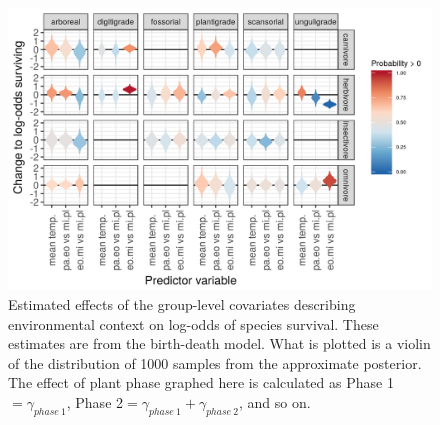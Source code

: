 \documentclass[12pt,letterpaper]{article}
\begin{document}
\begin{figure}[ht]
  \centering
  \includegraphics[width=\textwidth,height=0.4\textheight,keepaspectratio=true]{figure/group_on_survival_bd}
  \caption[Effects of group-level covariates on log-odds of ecotype survival as estimated from the birth-death model]{Estimated effects of the group-level covariates describing environmental context on log-odds of species survival. These estimates are from the birth-death model. What is plotted is a violin of the distribution of 1000 samples from the approximate posterior. The effect of plant phase graphed here is calculated as Phase 1\( = \gamma_{phase\ 1}\), Phase 2\( = \gamma_{phase\ 1} + \gamma_{phase\ 2}\), and so on.} 
  \label{fig:group_surv_bd}
\end{figure}
\end{document}
